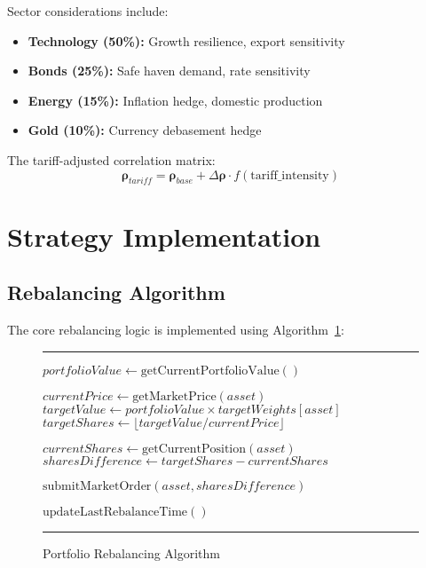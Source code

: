\documentclass[onecolumn,11pt]{IEEEtran}
\renewenvironment{algorithm}[1][h]
  {\begin{figure}[#1]
   \centering
   \begin{minipage}{0.9\textwidth}
   \hrule
   \vspace{0.3em}}
  {\vspace{0.3em}
   \hrule
   \end{minipage}
   \end{figure}}
\begin{document}
Sector considerations include:
\begin{itemize}
    \item \textbf{Technology (50\%):} Growth resilience, export sensitivity
    \item \textbf{Bonds (25\%):} Safe haven demand, rate sensitivity  
    \item \textbf{Energy (15\%):} Inflation hedge, domestic production
    \item \textbf{Gold (10\%):} Currency debasement hedge
\end{itemize}

The tariff-adjusted correlation matrix:
\begin{equation}
\boldsymbol{\rho}_{tariff} = \boldsymbol{\rho}_{base} + \Delta \boldsymbol{\rho} \cdot f(\text{tariff\_intensity})
\end{equation}

\section{Strategy Implementation}

\subsection{Rebalancing Algorithm}

The core rebalancing logic is implemented using Algorithm~\ref{alg:rebalance}:

\begin{algorithm}[h]
\caption{Portfolio Rebalancing Algorithm}
\label{alg:rebalance}
\begin{algorithmic}[1]
        \State \Return {}
    \EndIf
    
    \State $portfolioValue \gets \text{getCurrentPortfolioValue}()$
    
        \State $currentPrice \gets \text{getMarketPrice}(asset)$
        \State $targetValue \gets portfolioValue \times targetWeights[asset]$
        \State $targetShares \gets \lfloor targetValue / currentPrice \rfloor$
        
        \State $currentShares \gets \text{getCurrentPosition}(asset)$
        \State $sharesDifference \gets targetShares - currentShares$
        
            \State $\text{submitMarketOrder}(asset, sharesDifference)$
        \EndIf
    \EndFor
    
    \State $\text{updateLastRebalanceTime}()$
\EndFunction
\end{algorithmic}
\end{algorithm}
\end{document}
